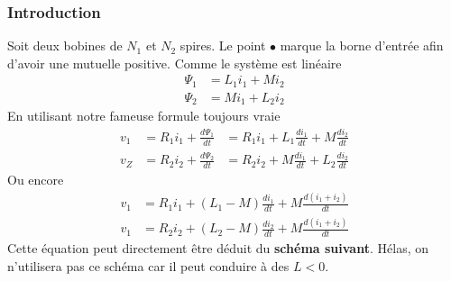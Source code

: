 		\subsubsection{Introduction}
		Soit deux bobines de $N_1$ et $N_2$ spires. Le point $\bullet$ marque 
		la borne d'entrée afin d'avoir une mutuelle positive. Comme le 
		système est linéaire
		\begin{equation}
		\begin{array}{ll}
		\Psi_1 &= L_1i_1 + Mi_2\\
		\Psi_2 &= Mi_1 + L_2i_2
		\end{array}
		\end{equation}
		En utilisant notre fameuse formule toujours vraie
		\begin{equation}
		\begin{array}{lll}
		v_1 &= R_1i_1 + \frac{d\Psi_1}{dt} &= R_1i_1 + L_1\frac{di_1}{dt}+M\frac{
		di_2}{dt}\\
		v_Z &= R_2i_2 + \frac{d\Psi_2}{dt} &= R_2i_2 + M\frac{di_1}{dt}+L_2\frac{
		di_2}{dt}
		\end{array}
		\end{equation}
		Ou encore
		\begin{equation}
		\begin{array}{ll}
		v_1 &= R_1i_1 + (L_1-M)\frac{di_1}{dt} + M\frac{d(i_1+i_2)}{dt}\\
		v_1 &= R_2i_2 + (L_2-M)\frac{di_2}{dt} + M\frac{d(i_1+i_2)}{dt}		
		\end{array}
		\end{equation}
		Cette équation peut directement être déduit du \textbf{schéma suivant}. 
		Hélas, on n'utilisera pas ce schéma car il peut conduire à des $L<0$.
		
